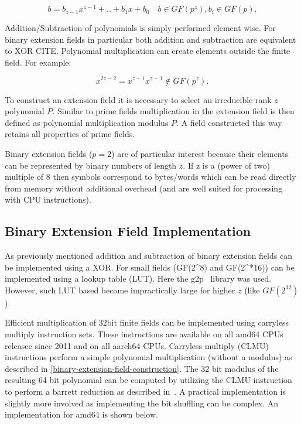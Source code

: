 \documentclass[
]{article}
\begin{document}
\begin{equation}
b = b_{z - 1} x^{z - 1} + .. + b_1 x + b_0 \quad b \in GF(p^z), b_i \in GF(p).
\end{equation}

Addition/Subtraction of polynomials is simply performed element wise.
For binary extension fields in particular both addition and subtraction
are equivalent to XOR CITE. Polynomial multiplication can create
elements outside the finite field. For example:

\begin{equation}
x^{2z - 2} = x^{z - 1} x^{z - 1} \notin GF(p^z).
\end{equation}

To construct an extension field it is necessary to select an irreducible
rank \(z\) polynomial \(P\). Similar to prime fields multiplication in
the extension field is then defined as polynomial multiplication modulus
\(P\). A field constructed this way retains all properties of prime
fields.

Binary extension fields (\(p = 2\)) are of particular interest because
their elements can be represented by binary numbers of length \(z\). If
z is a (power of two) multiple of 8 then symbols correspond to
bytes/words which can be read directly from memory without additional
overhead (and are well suited for processing with CPU instructions).

\hypertarget{binary-extension-field-implementation}{%
\subsection{Binary Extension Field
Implementation}\label{binary-extension-field-implementation}}

As previously mentioned addition and subtraction of binary extension
fields can be implemented using a XOR. For small fields (GF(2\^{}8) and
GF(2\^{}*16)) can be implemented using a lookup table (LUT). Here the
g2p~\cite{g2p} library was used. However, such LUT based become impractically
large for higher \(z\) (like $GF(2^{32})$).

Efficient multiplication of 32bit finite fields can be implemented using
carryless multiply instruction sets. These instructions are available on all amd64 CPUs releasec since 2011 and on all aarch64 CPUs. Carryless
multiply (CLMU) instructions perform a simple polynomial multiplication
(without a modulus) as described in \cref{binary-extension-field-construction}. The 32
bit modulus of the resulting 64 bit polynomial can be computed by
utilizing the CLMU instruction to perform a barrett reduction as
described in~\cite{intel2008}. A practical
implementation is slightly more involved as implementing the bit
shuffling can be complex. An implementation for amd64 is shown below.
\end{document}
